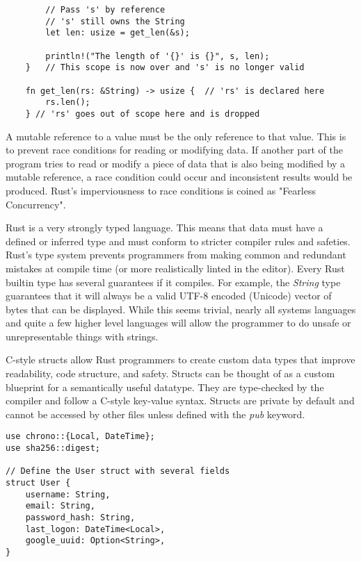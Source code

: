 \documentclass[12pt]{article}
\begin{document}
\begin{flushleft}
\begin{verbatim}
        // Pass 's' by reference
        // 's' still owns the String
        let len: usize = get_len(&s);

        println!("The length of '{}' is {}", s, len);
    }   // This scope is now over and 's' is no longer valid

    fn get_len(rs: &String) -> usize {  // 'rs' is declared here
        rs.len();
    } // 'rs' goes out of scope here and is dropped
\end{verbatim}
\doublespacing{}

A mutable reference to a value must be the only reference to that value. This
is to prevent race conditions for reading or modifying data. If another part of
the program tries to read or modify a piece of data that is also being modified
by a mutable reference, a race condition could occur and inconsistent results
would be produced. Rust's imperviousness to race conditions is coined as
"Fearless Concurrency". 


Rust is a very strongly typed language. This means that data must have a
defined or inferred type and must conform to stricter compiler rules and
safeties. Rust's type system prevents programmers from making common and
redundant mistakes at compile time (or more realistically linted in the
editor). Every Rust builtin type has several guarantees if it compiles. For
example, the \textit{String} type guarantees that it will always be a valid
UTF-8 encoded (Unicode) vector of bytes that can be displayed. While this seems
trivial, nearly all systems languages and quite a few higher level languages
will allow the programmer to do unsafe or unrepresentable things with strings.


C-style structs allow Rust programmers to create custom data types that improve
readability, code structure, and safety. Structs can be thought of as a custom
blueprint for a semantically useful datatype. They are type-checked by the
compiler and follow a C-style key-value syntax. Structs are private by default
and cannot be accessed by other files unless defined with the \textit{pub}
keyword.

\singlespacing{}
\begin{verbatim}
use chrono::{Local, DateTime};
use sha256::digest;

// Define the User struct with several fields
struct User {
    username: String,
    email: String,
    password_hash: String,
    last_logon: DateTime<Local>,
    google_uuid: Option<String>,
}


\end{verbatim}
\end{flushleft}
\end{document}

